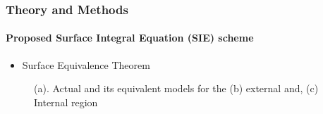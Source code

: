 \documentclass[mathserif,16pt,xcolor=table]{beamer}
\begin{document}
\begin{frame}
  \frametitle{Theory and Methods}
  \framesubtitle{Proposed Surface Integral Equation (SIE) scheme}

  \begin{itemize}
    \item{Surface Equivalence Theorem}
  \end{itemize}
  \begin{figure}
    \centering
    \def\svgwidth{1\linewidth}
    
    \caption{(a). Actual and its equivalent models for the (b) external and, (c) Internal region }
  \end{figure}
\end{frame}
\end{document}
